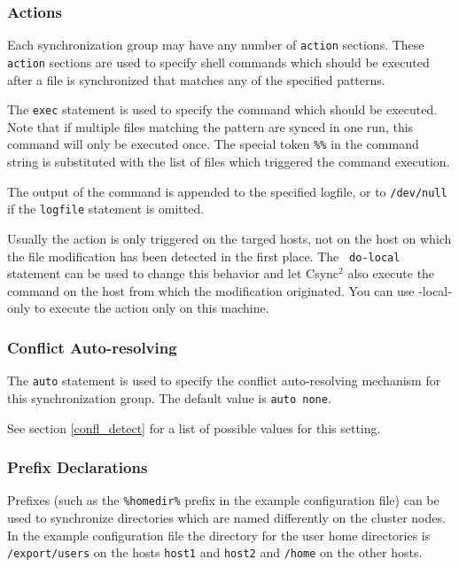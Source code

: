 \documentclass[a4paper,twocolumn]{article}
\def\csync2{{\sc Csync$^{2}$}}
\begin{document}
\subsubsection{Actions}

Each synchronization group may have any number of {\tt action} sections. These
{\tt action} sections are used to specify shell commands which should be
executed after a file is synchronized that matches any of the specified
patterns.

The {\tt exec} statement is used to specify the command which should be
executed. Note that if multiple files matching the pattern are synced in one
run, this command will only be executed once. The special token {\tt \%\%} in
the command string is substituted with the list of files which triggered the
command execution.

The output of the command is appended to the specified logfile, or to
{\tt /dev/null} if the {\tt logfile} statement is omitted.

Usually the action is only triggered on the targed hosts, not on the host on
which the file modification has been detected in the first place. The {\tt
do-local} statement can be used to change this behavior and let \csync2 also
execute the command on the host from which the modification originated. You can 
use {\ttdo-local-only} to execute the action only on this machine. 

\subsubsection{Conflict Auto-resolving}

The {\tt auto} statement is used to specify the conflict auto-resolving
mechanism for this synchronization group. The default value is {\tt auto none}.

See section \ref{confl_detect} for a list of possible values for this setting.

\subsubsection{Prefix Declarations}

Prefixes (such as the {\tt \%homedir\%} prefix in the example configuration
file) can be used to synchronize directories which are named differently on
the cluster nodes. In the example configuration file the directory for the
user home directories is {\tt /export/users} on the hosts {\tt host1} and
{\tt host2} and {\tt /home} on the other hosts.
\end{document}
